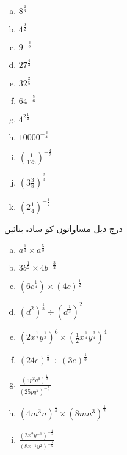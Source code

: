 \begin{multicols}{4}
\begin{enumerate}[a.]
\item
\(8^{\frac{2}{3}}\)
\item
\(4^{\frac{3}{2}}\)
\item
\(9^{-\frac{3}{2}}\)
\item
\(27^{\frac{4}{3}}\)
\item
\(32^{\frac{2}{5}}\)
\item
\(64^{-\frac{5}{6}}\)
\item
\(4^{2\frac{1}{2}}\)
\item
\(\num{10000}^{-\frac{3}{4}}\)
\item
\((\frac{1}{125})^{-\frac{4}{3}}\)
\item
\((3\frac{3}{8})^{\frac{2}{3}}\)
\item
\((2\frac{1}{4})^{-\frac{1}{2}}\)
\end{enumerate}
\end{multicols}

درج ذیل مساواتوں کو سادہ بنائیں
\begin{multicols}{3}
\begin{enumerate}[a.]
\item
\(a^{\frac{1}{3}}\times a^{\frac{5}{3}}\)
\item
\(3b^{\frac{1}{2}}\times 4b^{-\frac{3}{2}}\)
\item
\((6c^{\frac{1}{4}})\times (4c)^{\frac{1}{2}}\)
\item
\((d^{2})^{\frac{1}{3}}\div (d^{\frac{1}{3}})^{2}\)
\item
\((2x^{\frac{1}{2}}y^{\frac{1}{3}})^{6}\times (\frac{1}{2}x^{\frac{1}{4}}y^{\frac{3}{4}})^{4}\)
\item
\((24e)^{\frac{1}{3}}\div (3e)^{\frac{1}{3}}\)
\item
\(\frac{(5p^{2}q^{4})^{\frac{1}{3}}}{(25pq^{2})^{-\frac{1}{3}}}\)
\item
\((4m^{3}n)^{\frac{1}{4}}\times (8mn^{3})^{\frac{1}{2}}\)
\item
\(\frac{(2x^{2}y^{-1})^{-\frac{1}{4}}}{(8x^{-1}y^{2})^{-\frac{1}{2}}}\)
\end{enumerate}
\end{multicols}

